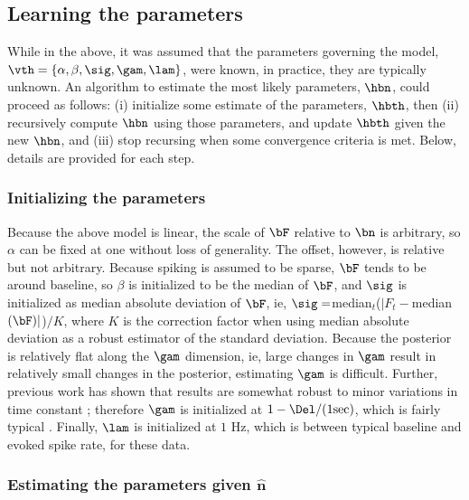 \subsection{Learning the parameters} \label{sec:learn}

While in the above, it was assumed that the parameters governing the model, $\vth=\{\alpha, \beta, \sig, \gam, \lam\}$, were known, in practice, they are typically unknown. An algorithm to estimate the most likely parameters, $\hbn$, could proceed as follows: (i) initialize some estimate of the parameters, $\hbth$, then (ii) recursively compute $\hbn$ using those parameters, and update $\hbth$ given the new $\hbn$, and (iii) stop recursing when some convergence criteria is met.  Below, details are provided for each step.

\subsubsection{Initializing the parameters} \label{sec:init}

Because the above model is linear, the scale of $\bF$ relative to $\bn$ is arbitrary, so $\alpha$ can be fixed at one without loss of generality. The offset, however, is relative but not arbitrary.  Because spiking is assumed to be sparse, $\bF$ tends to be around baseline, so $\beta$ is initialized to be the median of $\bF$, and $\sig$ is initialized as median absolute deviation of $\bF$, ie, $\sig=$median$_t$($|F_t-$median$(\bF)|$)$/K$, where $K$ is the correction factor when using median absolute deviation as a robust estimator of the standard deviation.  Because the posterior is relatively flat along the $\gam$ dimension, ie, large changes in $\gam$ result in relatively small changes in the posterior, estimating $\gam$ is difficult.  Further, previous work has shown that results are somewhat robust to minor variations in time constant \cite{YaksiFriedrich06}; therefore $\gam$ is initialized at $1-\Del/(1 \text{sec})$, which is fairly typical \cite{PologrutoSvoboda04}. Finally, $\lam$ is initialized at $1$ Hz, which is between typical baseline and evoked spike rate, for these data.

\subsubsection{Estimating the parameters given $\widehat{\mathbf{n}}$}

